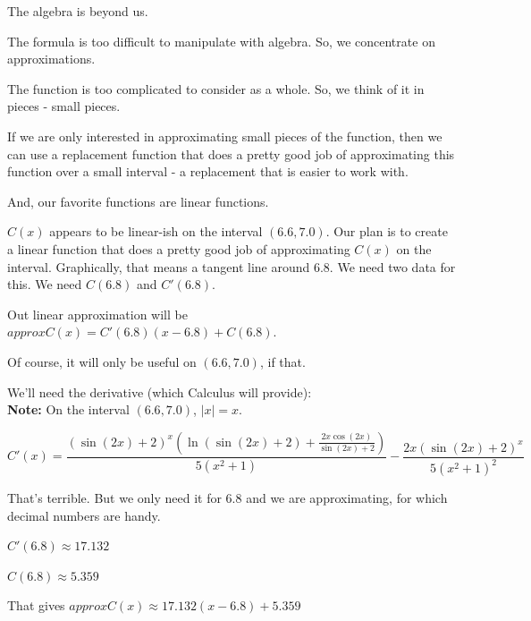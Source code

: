 \documentclass{ximera}
\begin{document}
The algebra is beyond us. 




The formula is too difficult to manipulate with algebra.  So, we concentrate on approximations. 


The function is too complicated to consider as a whole. So, we think of it in pieces - small pieces. 






If we are only interested in approximating small pieces of the function, then we can use a replacement function that does a pretty good job of approximating this function over a small interval - a replacement that is easier to work with.

And, our favorite functions are linear functions.


$C(x)$ appears to be linear-ish on the interval $(6.6, 7.0)$. Our plan is to create a linear function that does a pretty good job of approximating $C(x)$ on the interval. Graphically, that means a tangent line around $6.8$.  We need two data for this.  We need $C(6.8)$ and $C'(6.8)$.





Out linear approximation will be $approxC(x) = C'(6.8)(x-6.8) + C(6.8)$.

Of course, it will only be useful on $(6.6, 7.0)$, if that. 




We'll need the derivative (which Calculus will provide): \\
\textbf{Note:} On the interval $(6.6, 7.0)$, $| x | = x$.

\[  
C'(x) = \frac{(\sin(2x)+2)^x (\ln(\sin(2x)+2) + \frac{2 x \cos(2x)}{\sin(2x)+2})}{5(x^2+1)} - \frac{2x(\sin(2x)+2)^x}{5(x^2+1)^2}
\]




That's terrible.  But we only need it for $6.8$ and we are approximating, for which decimal numbers are handy.

$C'(6.8) \approx 17.132$


$C(6.8) \approx 5.359$


That gives $approxC(x) \approx 17.132(x-6.8)+5.359$
\end{document}
